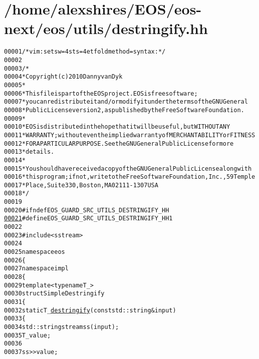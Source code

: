 \hypertarget{destringify_8hh_source}{
\section{/home/alexshires/EOS/eos-\/next/eos/utils/destringify.hh}
}


\begin{footnotesize}\begin{alltt}
00001 \textcolor{comment}{/* vim: set sw=4 sts=4 et foldmethod=syntax : */}
00002 
00003 \textcolor{comment}{/*}
00004 \textcolor{comment}{ * Copyright (c) 2010 Danny van Dyk}
00005 \textcolor{comment}{ *}
00006 \textcolor{comment}{ * This file is part of the EOS project. EOS is free software;}
00007 \textcolor{comment}{ * you can redistribute it and/or modify it under the terms of the GNU General}
00008 \textcolor{comment}{ * Public License version 2, as published by the Free Software Foundation.}
00009 \textcolor{comment}{ *}
00010 \textcolor{comment}{ * EOS is distributed in the hope that it will be useful, but WITHOUT ANY}
00011 \textcolor{comment}{ * WARRANTY; without even the implied warranty of MERCHANTABILITY or FITNESS}
00012 \textcolor{comment}{ * FOR A PARTICULAR PURPOSE.  See the GNU General Public License for more}
00013 \textcolor{comment}{ * details.}
00014 \textcolor{comment}{ *}
00015 \textcolor{comment}{ * You should have received a copy of the GNU General Public License along with}
00016 \textcolor{comment}{ * this program; if not, write to the Free Software Foundation, Inc., 59 Temple}
00017 \textcolor{comment}{ * Place, Suite 330, Boston, MA  02111-1307  USA}
00018 \textcolor{comment}{ */}
00019 
00020 \textcolor{preprocessor}{#ifndef EOS\_GUARD\_SRC\_UTILS\_DESTRINGIFY\_HH}
\hypertarget{destringify_8hh_source_l00021}{}\hyperlink{destringify_8hh_a5ddb52da9553aaff631ac76e53ac5f91}{00021} \textcolor{preprocessor}{}\textcolor{preprocessor}{#define EOS\_GUARD\_SRC\_UTILS\_DESTRINGIFY\_HH 1}
00022 \textcolor{preprocessor}{}
00023 \textcolor{preprocessor}{#include <sstream>}
00024 
00025 \textcolor{keyword}{namespace }eos
00026 \{
00027     \textcolor{keyword}{namespace }impl
00028     \{
00029         \textcolor{keyword}{template} <\textcolor{keyword}{typename} T\_>
00030         \textcolor{keyword}{struct }SimpleDestringify
00031         \{
00032             \textcolor{keyword}{static} T\_ \hyperlink{namespaceeos_ad3134beb65a048a00ed3607d0af90202}{destringify}(\textcolor{keyword}{const} std::string & input)
00033             \{
00034                 std::stringstream ss(input);
00035                 T\_ value;
00036 
00037                 ss >> value;

\end{alltt}
\end{footnotesize}
